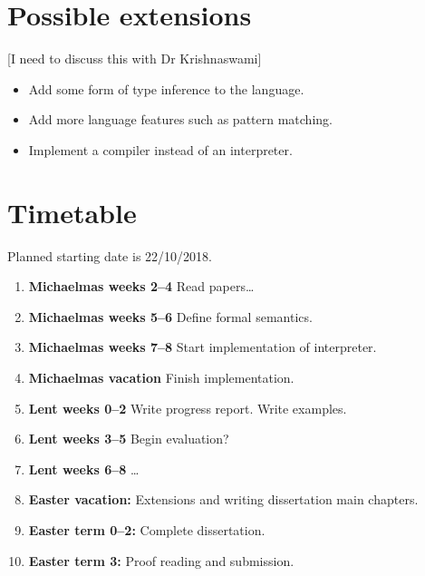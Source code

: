 \documentclass[12pt,a4paper,twoside]{article}
\begin{document}
\section*{Possible extensions}

[I need to discuss this with Dr Krishnaswami]

\begin{itemize}
	\item Add some form of type inference to the language.
	\item Add more language features such as pattern matching.
	\item Implement a compiler instead of an interpreter.
\end{itemize}


\section*{Timetable}

Planned starting date is 22/10/2018.

\begin{enumerate}

\item \textbf{Michaelmas weeks 2--4} Read papers\ldots

\item \textbf{Michaelmas weeks 5--6} Define formal semantics.

\item \textbf{Michaelmas weeks 7--8} Start implementation of interpreter.

\item \textbf{Michaelmas vacation} Finish implementation.

\item \textbf{Lent weeks 0--2} Write progress report. Write examples.

\item \textbf{Lent weeks 3--5} Begin evaluation?

\item \textbf{Lent weeks 6--8} \ldots

\item \textbf{Easter vacation:} Extensions and writing dissertation main chapters.

\item \textbf{Easter term 0--2:}  Complete dissertation.

\item \textbf{Easter term 3:} Proof reading and submission.

\end{enumerate}
\end{document}
